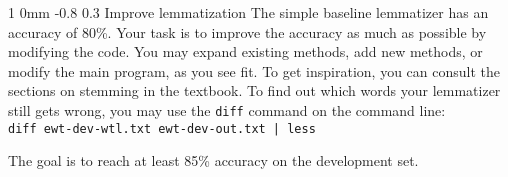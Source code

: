 \documentclass[11pt]{article}
\makeatletter
\newcommand{\newsec}[2]{\section{#1}\label{sec:#2}\noindent}
\renewcommand{\section}{\@startsection
{section}%
{1}%
{0mm}%
{-0.8\baselineskip}%
{0.3\baselineskip}%
{\bfseries\large}}%
\makeatother
\begin{document}
\newsec{Improve lemmatization}{improve}%
The simple baseline lemmatizer has an accuracy of 80\%. Your task is
to improve the accuracy as much as possible by modifying the code. You
may expand existing methods, add new methods, or modify the main
program, as you see fit. To get inspiration, you can consult the
sections on stemming in the textbook. To find out which words your
lemmatizer still gets wrong, you may use the \texttt{diff} command on
the command line:\\

\noindent
\texttt{diff ewt-dev-wtl.txt ewt-dev-out.txt | less}\\

\noindent
The goal is to reach at least 85\% accuracy on the development set.

\end{document}
